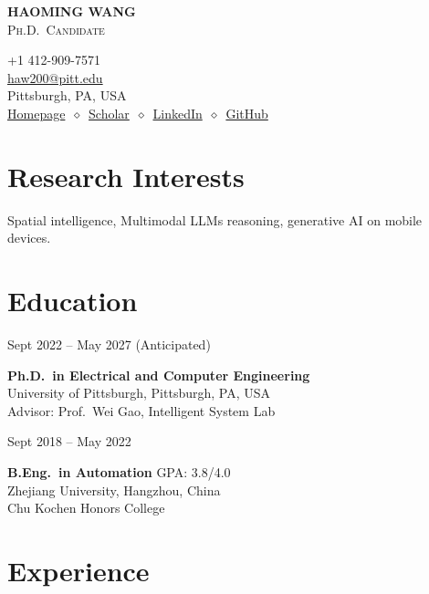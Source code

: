 \documentclass[11pt, letterpaper]{article}
\newenvironment{datedentry}[1]{%
  \par\noindent
  \begin{minipage}[t]{2.8cm}\raggedright\small #1\end{minipage}%
  \hspace{0.3cm}%
  \begin{minipage}[t]{\dimexpr\linewidth-3.1cm\relax}\raggedright
}{\end{minipage}\par\medskip}
\begin{document}
\noindent
\begin{minipage}[t]{0.58\linewidth}
  \vspace{0pt}
  {\fontsize{24pt}{26pt}\selectfont \textbf{HAOMING WANG}}\\[2pt]
  {\scshape\normalsize Ph.D.\ Candidate}
\end{minipage}%
\begin{minipage}[t]{0.42\linewidth}
  \vspace{0pt}
  \raggedleft\small
  +1 412-909-7571 \\
  \href{mailto:haw200@pitt.edu}{haw200@pitt.edu} \\
  Pittsburgh, PA, USA \\[2pt]
  \href{https://haomingwang645.github.io/}{Homepage}\ $\diamond$\ \href{https://scholar.google.com.hk/citations?user=bf6LCjUAAAAJ}{Scholar}\ $\diamond$\ \href{https://www.linkedin.com/in/haoming-wang-40a6a7239/}{LinkedIn}\ $\diamond$\ \href{https://github.com/HaomingWang645}{GitHub}
\end{minipage}

\section{Research Interests}
Spatial intelligence, Multimodal LLMs reasoning, generative AI on mobile devices.

\section{Education}

\begin{datedentry}{Sept 2022 -- May 2027 (Anticipated)}
\textbf{Ph.D.\ in Electrical and Computer Engineering}\\
University of Pittsburgh, Pittsburgh, PA, USA\\
Advisor: Prof.\ Wei Gao, Intelligent System Lab
\end{datedentry}

\begin{datedentry}{Sept 2018 -- May 2022}
\textbf{B.Eng.\ in Automation} \hfill GPA: 3.8/4.0\\
Zhejiang University, Hangzhou, China\\
Chu Kochen Honors College
\end{datedentry}

\section{Experience}
\end{document}
